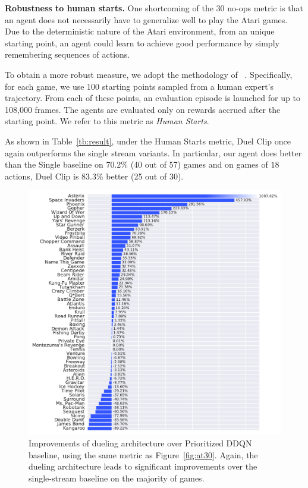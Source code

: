 {\bf Robustness to human starts.}
One shortcoming of the 30 no-ops metric is that an agent does not necessarily have
to generalize well to play the Atari games.
Due to the deterministic nature of the Atari environment, 
from an unique starting point, an agent could learn to achieve good performance by simply 
remembering sequences of actions.

To obtain a more robust measure, we adopt the methodology of 
~\citet{Nair:2015}.
Specifically, for each game, we use 100 starting points sampled from a human expert's trajectory.
From each of these points, an evaluation episode is launched for up to 108,000 frames.
The agents are evaluated only on rewards accrued after the starting point. We refer to this metric as \emph{Human Starts}.

As shown in Table~\ref{tb:result}, under the Human Starts metric, Duel Clip once again outperforms the single stream variants. In particular, our agent does better than the Single baseline on 70.2\% (40 out of 57) games
and on games of $18$ actions, Duel Clip is 83.3\% better (25 out of 30).



\begin{figure}[t!]
\begin{center}
	\includegraphics[scale=0.47]{./figs/pri_duel_vs_pri_11c}
\end{center}
\caption{\label{fig:at30_priduel} 
Improvements of dueling architecture over Prioritized DDQN baseline, using the same metric as Figure~\ref{fig:at30}. 
Again, the dueling architecture leads to significant improvements over the single-stream baseline on the majority of games.
}
\end{figure}



